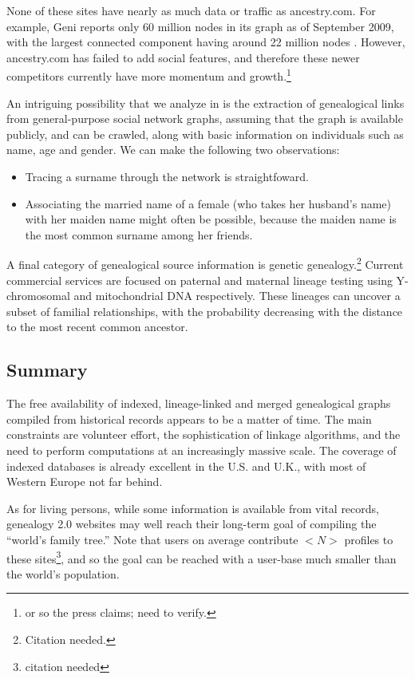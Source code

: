 \documentclass{article}
\begin{document}
None of these sites have nearly as much data or traffic as ancestry.com. For example, Geni reports only 60 million nodes in its graph as of September 2009, with the largest connected component having around 22 million nodes \cite{wp-geni.com}. However, ancestry.com has failed to add social features, and therefore these newer competitors currently have more momentum and growth.\footnote{or so the press claims; need to verify.}

An intriguing possibility that we analyze in \cite{techreport} is the extraction of genealogical links from general-purpose social network graphs, assuming that the graph is available publicly, and can be crawled, along with basic information on individuals such as name, age and gender. We can make the following two observations: 
\begin{itemize}
\item
Tracing a surname through the network is straightfoward.
\item
Associating the married name of a female (who takes her husband's name) with her maiden name might often be possible, because the maiden name is the most common surname among her friends.
\end{itemize}

A final category of genealogical source information is genetic genealogy.\footnote{Citation needed.} Current commercial services are focused on paternal and maternal lineage testing using Y-chromosomal and mitochondrial DNA respectively. These lineages can uncover a subset of familial relationships, with the probability decreasing with the distance to the most recent common ancestor.

\subsection{Summary}
The free availability of indexed, lineage-linked and merged genealogical graphs compiled from historical records appears to be a matter of time. The main constraints are volunteer effort, the sophistication of linkage algorithms, and the need to perform computations at an increasingly massive scale. The coverage of indexed databases is already excellent in the U.S. and U.K., with most of Western Europe not far behind. 

As for living persons, while some information is available from vital records, genealogy 2.0 websites may well reach their long-term goal of compiling the ``world's family tree.'' Note that users on average contribute $<N>$ profiles to these sites\footnote{citation needed}, and so the goal can be reached with a user-base much smaller than the world's population. 
\end{document}
